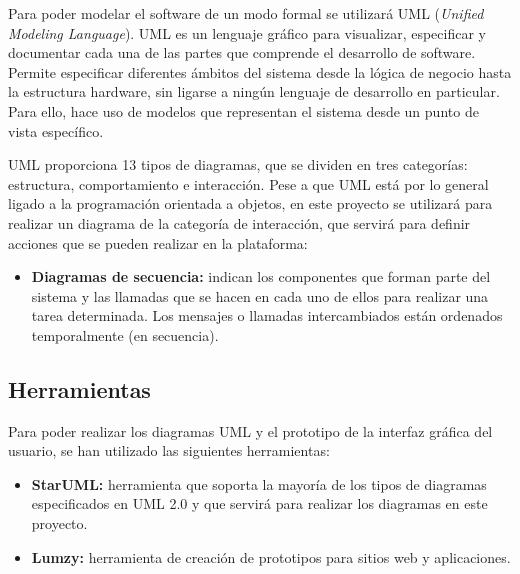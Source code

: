 Para poder modelar el software de un modo formal se utilizará UML (\textit{Unified Modeling Language}). UML es un lenguaje gráfico para visualizar, especificar y documentar cada una de las partes que comprende el desarrollo de software. Permite especificar diferentes ámbitos del sistema desde la lógica de negocio hasta la estructura hardware, sin ligarse a ningún lenguaje de desarrollo en particular. Para ello, hace uso de modelos que representan el sistema desde un punto de vista específico.

UML proporciona 13 tipos de diagramas, que se dividen en tres categorías: estructura, comportamiento e interacción. Pese a que UML está por lo general ligado a la programación orientada a objetos, en este proyecto se utilizará para realizar un diagrama de la categoría de interacción, que servirá para definir acciones que se pueden realizar en la plataforma:

\noindent
\begin{itemize}
\item \textbf{Diagramas de secuencia:} indican los componentes que forman parte del sistema y las llamadas que se hacen en cada uno de ellos para realizar una tarea determinada. Los mensajes o llamadas intercambiados están ordenados temporalmente (en secuencia).
\end{itemize}

\subsection{Herramientas}
Para poder realizar los diagramas UML y el prototipo de la interfaz gráfica del usuario, se han utilizado las siguientes herramientas:

\begin{itemize}
\item \textbf{StarUML:} herramienta que soporta la mayoría de los tipos de diagramas especificados en UML 2.0 y que servirá para realizar los diagramas en este proyecto.
\item \textbf{Lumzy:} herramienta de creación de prototipos para sitios web y aplicaciones.
\end{itemize}

